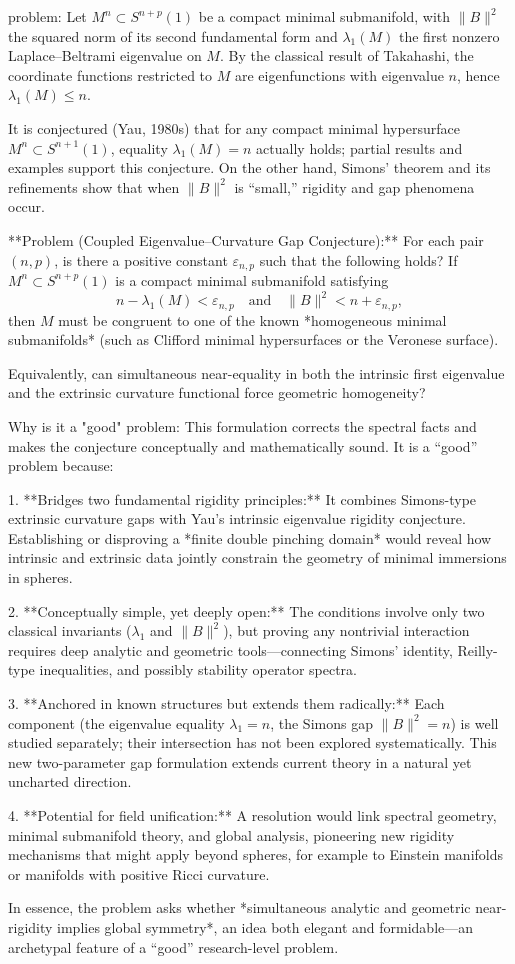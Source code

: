 problem:  
Let \(M^n \subset S^{n+p}(1)\) be a compact minimal submanifold, with \(\|B\|^2\) the squared norm of its second fundamental form and \(\lambda_1(M)\) the first nonzero Laplace–Beltrami eigenvalue on \(M\). By the classical result of Takahashi, the coordinate functions restricted to \(M\) are eigenfunctions with eigenvalue \(n\), hence \(\lambda_1(M) \le n\).  

It is conjectured (Yau, 1980s) that for any compact minimal hypersurface \(M^n \subset S^{n+1}(1)\), equality \(\lambda_1(M) = n\) actually holds; partial results and examples support this conjecture. On the other hand, Simons’ theorem and its refinements show that when \(\|B\|^2\) is “small,” rigidity and gap phenomena occur.  

**Problem (Coupled Eigenvalue–Curvature Gap Conjecture):**  
For each pair \((n,p)\), is there a positive constant \(\varepsilon_{n,p}\) such that the following holds?  
If \(M^n \subset S^{n+p}(1)\) is a compact minimal submanifold satisfying  
\[
n - \lambda_1(M) < \varepsilon_{n,p}
\quad\text{and}\quad
\|B\|^2 < n + \varepsilon_{n,p},
\]
then \(M\) must be congruent to one of the known *homogeneous minimal submanifolds* (such as Clifford minimal hypersurfaces or the Veronese surface).  

Equivalently, can simultaneous near-equality in both the intrinsic first eigenvalue and the extrinsic curvature functional force geometric homogeneity?  

Why is it a "good" problem:  
This formulation corrects the spectral facts and makes the conjecture conceptually and mathematically sound. It is a “good” problem because:

1. **Bridges two fundamental rigidity principles:**  
   It combines Simons-type extrinsic curvature gaps with Yau’s intrinsic eigenvalue rigidity conjecture. Establishing or disproving a *finite double pinching domain* would reveal how intrinsic and extrinsic data jointly constrain the geometry of minimal immersions in spheres.

2. **Conceptually simple, yet deeply open:**  
   The conditions involve only two classical invariants (\(\lambda_1\) and \(\|B\|^2\)), but proving any nontrivial interaction requires deep analytic and geometric tools—connecting Simons’ identity, Reilly-type inequalities, and possibly stability operator spectra.

3. **Anchored in known structures but extends them radically:**  
   Each component (the eigenvalue equality \(\lambda_1=n\), the Simons gap \(\|B\|^2=n\)) is well studied separately; their intersection has not been explored systematically. This new two-parameter gap formulation extends current theory in a natural yet uncharted direction.

4. **Potential for field unification:**  
   A resolution would link spectral geometry, minimal submanifold theory, and global analysis, pioneering new rigidity mechanisms that might apply beyond spheres, for example to Einstein manifolds or manifolds with positive Ricci curvature.

In essence, the problem asks whether *simultaneous analytic and geometric near-rigidity implies global symmetry*, an idea both elegant and formidable—an archetypal feature of a “good” research-level problem.